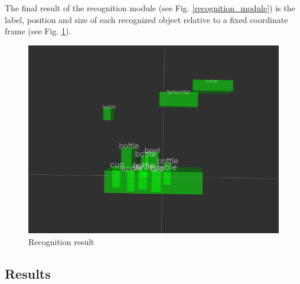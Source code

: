 \documentclass[a4paper, twocolumn]{article}
\begin{document}
    The final result of the recognition module (see Fig. \ref{recognition_module}) is the label, position and size of each recognized object relative to a fixed coordinate frame (see Fig. \ref{recognition_result}).

    \begin{figure}[!b]
        \includegraphics[width=\columnwidth]{../img/recog_markers.jpg}
        \caption{Recognition result}
        \label{recognition_result}
    \end{figure}

    \subsection{Results}
\end{document}

